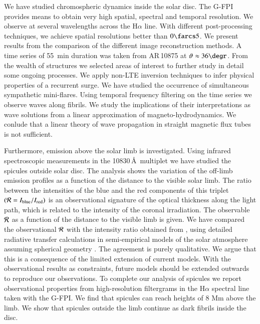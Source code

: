 \documentclass[goettingen,print]{thesis}
\begin{document}
We have studied chromospheric dynamics inside the solar disc. The G-FPI provides means to obtain very high spatial, spectral and temporal resolution. We observe at several wavelengths across the H$\alpha$ line. With different post-processing techniques, we achieve spatial resolutions better than $0\farcs5$. We present results from the comparison of the different image reconstruction methods.  A time series of 55~min duration was taken from AR\,10875 at $\vartheta\approx36\degr$. From the wealth of structures we selected areas of interest to further study in detail some ongoing processes. We apply non-LTE inversion techniques to infer physical properties of a recurrent surge. We have studied the occurrence of simultaneous sympathetic mini-flares. Using temporal frequency filtering on the time series we observe waves along fibrils. We study the implications of their interpretations as wave solutions from a linear approximation of magneto-hydrodynamics. We conlude that a linear theory of wave propagation in straight magnetic flux tubes is not sufficient. 

Furthermore, emission above the solar limb is investigated. Using infrared spectroscopic measurements in the  10830\,\AA\ multiplet
 we have studied the spicules outside solar disc. The analysis shows the variation of the  off-limb emission profiles as a function of the distance to the visible solar limb. The 
ratio between the intensities of the blue and the red components of this triplet $({\cal R}=I_{\rm blue}/I_{\rm red})$ is an observational signature of the optical thickness along the light path, which is related to the intensity of the coronal irradiation. The observable ${\cal R}$ as a function of the distance to the visible limb is given. We have compared the observational ${\cal R}$ with the intensity ratio obtained from \citet{Centeno06}, using detailed radiative transfer calculations in semi-empirical models of the solar atmosphere assuming spherical geometry
. The agreement is purely qualitative. We argue that this is a consequence of the limited extension of current models. With the observational results as constraints, future models should be extended outwards to reproduce our observations. To complete our analysis of spicules we report observational properties from high-resolution filtergrams in the H$\alpha$ spectral line taken with the G-FPI. We find that spicules can reach heights of 8 Mm above the limb. We show that spicules outside the limb continue as dark fibrils inside the disc.
\nopagebreak 
\end{document}
